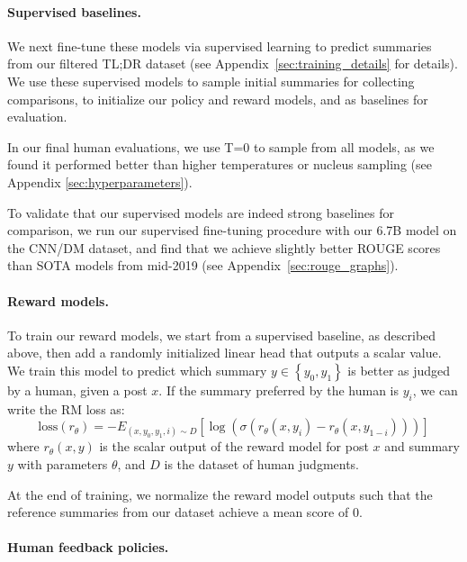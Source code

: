 \paragraph{Supervised baselines.} We next fine-tune these models via supervised learning to predict summaries from our filtered TL;DR dataset (see Appendix~\ref{sec:training_details} for details). We use these supervised models to sample initial summaries for collecting comparisons, to initialize our policy and reward models, and as baselines for evaluation.

In our final human evaluations, we use T=0 to sample from all models, as we found it performed better than higher temperatures or nucleus sampling (see Appendix \ref{sec:hyperparameters}).  

To validate that our supervised models are indeed strong baselines for comparison, we run our supervised fine-tuning procedure with our 6.7B model on the CNN/DM dataset, and find that we achieve slightly better ROUGE scores than SOTA models \cite{zhang2019abstract} from mid-2019 (see Appendix~\ref{sec:rouge_graphs}). 

\paragraph{Reward models.} 

To train our reward models, we start from a supervised baseline, as described above, then add a randomly initialized linear head that outputs a scalar value. We train this model to predict which summary $y \in \left\{y_0, y_1\right\}$ is better as judged by a human, given a post $x$.  If the summary preferred by the human is $y_i$, we can write the RM loss as: $$
\text{loss}(r_\theta) = - E_{(x, y_0, y_1, i) \sim D} [\log ( \sigma( r_\theta(x, y_i) - r_{\theta}(x, y_{1-i} ) )) ] $$ where $r_\theta(x,y)$ is the scalar output of the reward model for post $x$ and summary $y$ with parameters $\theta$, and $D$ is the dataset of human judgments.

At the end of training, we normalize the reward model outputs such that the reference summaries from our dataset achieve a mean score of 0. 

\paragraph{Human feedback policies.}

